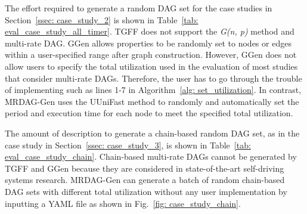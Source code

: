 The effort required to generate a random DAG set for the case studies in Section~\ref{ssec: case_study_2} is shown in Table~\ref{tab: eval_case_study_all_timer}.
TGFF does not support the {\it G(n, p)} method and multi-rate DAG.
GGen allows properties to be randomly set to nodes or edges within a user-specified range after graph construction.
However, GGen does not allow users to specify the total utilization used in the evaluation of most studies that consider multi-rate DAGs.
Therefore, the user has to go through the trouble of implementing such as lines 1-7 in Algorithm~\ref{alg: set_utilization}.
In contrast, MRDAG-Gen uses the UUniFast method to randomly and automatically set the period and execution time for each node to meet the specified total utilization.


\begin{table}[tb]
    \centering
    \caption{Effort required to generate random DAG sets \\ for {\it Case Study 3} \cite{tang2020response, choi2021picas}}
    \label{tab: eval_case_study_chain}
    \renewcommand{\arraystretch}{1.2}
\end{table}


The amount of description to generate a chain-based random DAG set, as in the case study in Section~\ref{ssec: case_study_3}, is shown in Table~\ref{tab: eval_case_study_chain}.
Chain-based multi-rate DAGs cannot be generated by TGFF and GGen because they are considered in state-of-the-art self-driving systems research.
MRDAG-Gen can generate a batch of random chain-based DAG sets with different total utilization without any user implementation by inputting a YAML file as shown in Fig.~\ref{fig: case_study_chain}.

